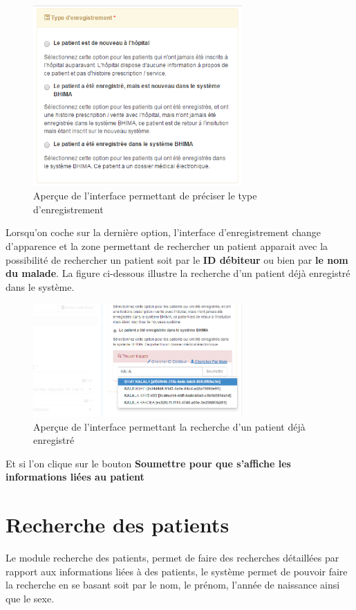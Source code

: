 \documentclass[12pt,a4paper]{report}
\begin{document}
\begin{figure}[h]
\begin{center}
\includegraphics[width=8cm]{pic/TypeEnregistrement.png}
\end{center}
\caption{Aperçue de l'interface permettant de préciser le type d'enregistrement}
\label{Aperçue de l'interface permettant de préciser le type d'enregistrement}
\end{figure}  
\newpage
Lorsqu'on coche sur la dernière option, l'interface d'enregistrement change d'apparence et la zone permettant de rechercher un patient apparait avec la possibilité de rechercher un patient soit par le \textbf{ID débiteur} ou bien par \textbf{le nom du malade}. La figure ci-dessous illustre la recherche d'un patient déjà enregistré dans le système.

\begin{figure}[h]
\begin{center}
\includegraphics[width=8cm]{pic/ApRecherche.png}
\end{center}
\caption{Aperçue de l'interface permettant la recherche d'un patient déjà enregistré}
\label{Aperçue de l'interface permettant la recherche d'un patient déjà enregistré}
\end{figure}  

Et si l'on clique sur le bouton \textbf{Soumettre pour que s'affiche les informations liées au patient}

\newpage
\section{Recherche des patients}
Le module recherche des patients, permet de faire des recherches détaillées par rapport aux informations liées à des patients, le système permet de pouvoir faire la recherche en se basant soit par le nom, le prénom, l'année de naissance ainsi que le sexe.
\end{document}
